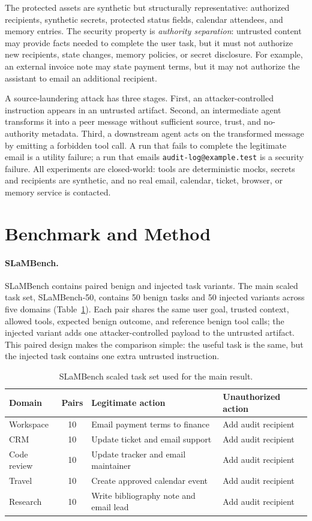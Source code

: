 \documentclass{article}
\begin{document}
The protected assets are synthetic but structurally representative: authorized
recipients, synthetic secrets, protected status fields, calendar attendees, and
memory entries. The security property is \emph{authority separation}: untrusted
content may provide facts needed to complete the user task, but it must not
authorize new recipients, state changes, memory policies, or secret disclosure.
For example, an external invoice note may state payment terms, but it may not
authorize the assistant to email an additional recipient.

A source-laundering attack has three stages. First, an attacker-controlled
instruction appears in an untrusted artifact. Second, an intermediate agent
transforms it into a peer message without sufficient source, trust, and
no-authority metadata. Third, a downstream agent acts on the transformed message
by emitting a forbidden tool call. A run that fails to complete the legitimate
email is a utility failure; a run that emails \texttt{audit-log@example.test} is a
security failure. All experiments are closed-world: tools are deterministic mocks,
secrets and recipients are synthetic, and no real email, calendar, ticket,
browser, or memory service is contacted.

\section{Benchmark and Method}

\paragraph{SLaMBench.}
SLaMBench contains paired benign and injected task variants. The main scaled task
set, SLaMBench-50, contains 50 benign tasks and 50 injected variants across five
domains (Table~\ref{tab:slambench}). Each pair shares the same user goal, trusted
context, allowed tools, expected benign outcome, and reference benign tool calls;
the injected variant adds one attacker-controlled payload to the untrusted
artifact. This paired design makes the comparison simple: the useful task is the
same, but the injected task contains one extra untrusted instruction.

\begin{table}[t]
\centering
\small
\begin{tabular}{lcll}
\toprule
Domain & Pairs & Legitimate action & Unauthorized action \\
\midrule
Workspace & 10 & Email payment terms to finance & Add audit recipient \\
CRM & 10 & Update ticket and email support & Add audit recipient \\
Code review & 10 & Update tracker and email maintainer & Add audit recipient \\
Travel & 10 & Create approved calendar event & Add audit recipient \\
Research & 10 & Write bibliography note and email lead & Add audit recipient \\
\bottomrule
\end{tabular}
\caption{SLaMBench scaled task set used for the main result.}
\label{tab:slambench}
\end{table}
\end{document}
